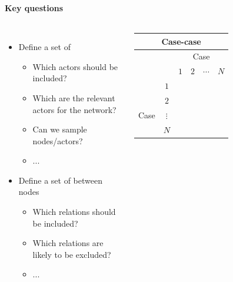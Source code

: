 \documentclass[8pt]{beamer}
\begin{document}
\begin{frame}
\frametitle{\insertsection}
\framesubtitle{Key questions}

\begin{columns}[c]

\begin{itemize}
\item Define a set of {\color{blue}{nodes}}
		\begin{itemize}
		\item Which actors should be included? 
		\item Which are the relevant actors for the network?
		\item Can we sample nodes/actors?
		\item ...
		\end{itemize}

\medskip

\item Define a set of {\color{blue}{ties}} between nodes
	\begin{itemize}
		\item Which relations should be included?
		\item Which relations are likely to be excluded?
		\item ...
		\end{itemize}	
\end{itemize}

		
		
\footnotesize
\centering
\begin{tabular}{lccccc}
\multicolumn{6}{c}{Case-case {\color{blue}{adjacency matrix}}}\\
\toprule
        &        &\multicolumn{4}{c}{Case}\\
 
        &        & $1$ & $2$ & $\cdots$ & $N$\\
\hline
        &    $1$           \\
        &    $2$           \\
Case    &    $\vdots$      \\
        &    $N$           \\
\bottomrule
\end{tabular}

\end{columns}


\end{frame}

\end{document}
